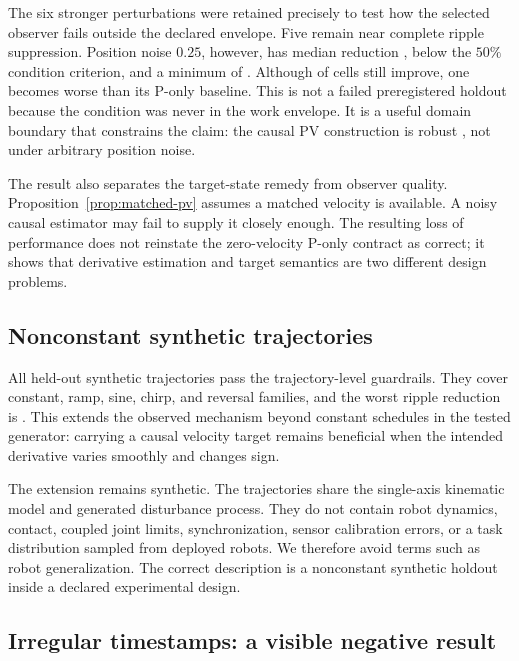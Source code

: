 The six stronger perturbations were retained precisely to test how the selected observer fails outside the declared envelope. Five remain near complete ripple suppression. Position noise $0.25$, however, has median reduction \ESeventeenStressMedianPercent, below the $50\%$ condition criterion, and a minimum of \ESeventeenStressMinimumPercent. Although \ESeventeenStressImprovedCount{} of \ESeventeenPairPerCondition{} cells still improve, one becomes worse than its P-only baseline. This is not a failed preregistered holdout because the condition was never in the work envelope. It is a useful domain boundary that constrains the claim: the causal PV construction is robust \testedEnvelope, not under arbitrary position noise.

The result also separates the target-state remedy from observer quality. Proposition~\ref{prop:matched-pv} assumes a matched velocity is available. A noisy causal estimator may fail to supply it closely enough. The resulting loss of performance does not reinstate the zero-velocity P-only contract as correct; it shows that derivative estimation and target semantics are two different design problems.

\subsection{Nonconstant synthetic trajectories}

All \ESeventeenSyntheticCount{} held-out synthetic trajectories pass the trajectory-level guardrails. They cover constant, ramp, sine, chirp, and reversal families, and the worst ripple reduction is \ESeventeenSyntheticWorstPercent. This extends the observed mechanism beyond constant schedules in the tested generator: carrying a causal velocity target remains beneficial when the intended derivative varies smoothly and changes sign.

The extension remains synthetic. The trajectories share the single-axis kinematic model and generated disturbance process. They do not contain robot dynamics, contact, coupled joint limits, synchronization, sensor calibration errors, or a task distribution sampled from deployed robots. We therefore avoid terms such as robot generalization. The correct description is a nonconstant synthetic holdout inside a declared experimental design.

\subsection{Irregular timestamps: a visible negative result}

